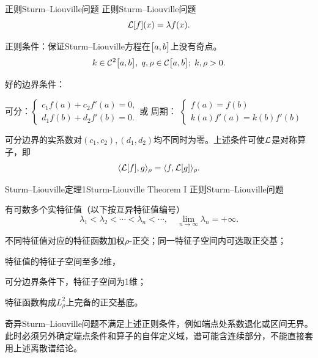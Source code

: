 \begin{definition}{正则Sturm--Liouville问题}{}
    正则Sturm--Liouville问题
    \begin{equation}
        \label{eq:mmp-sturm-liouville-eigenproblem}
        \operatorname{\mathcal L}[f](x) = \lambda f(x).
    \end{equation}
    
    正则条件：保证Sturm--Liouville方程在$\bigl[a,b\bigr]$上没有奇点。
    \begin{equation}
        \label{eq:mmp-regular-sturm-liouville-coefficients}
        k \in \mathcal{C}^2\bigl[a,b\bigr],\;q,\rho \in \mathcal{C}\bigl[a,b\bigr];\;k,\rho > 0.
    \end{equation}
    
    
    好的边界条件：
    \begin{center}
    	可分：$\begin{cases}
                c_1f(a) + c_2f'(a) = 0, \\
                d_1f(b) + d_2f'(b) = 0.
    		\end{cases}$\quad 或 \quad 周期：
    	$\begin{cases}
                f(a) = f(b) \\
			k(a)f'(a) = k(b)f'(b)
    		\end{cases}$
    \end{center}
    可分边界的实系数对$(c_1,c_2),(d_1,d_2)$均不同时为零。上述条件可使$\operatorname{\mathcal L}$是对称算子，即
    \begin{equation}
        \label{eq:mmp-symmetric-sturm-liouville}
        \langle\operatorname{\mathcal L}[f],g\rangle_\rho = \langle f,\operatorname{\mathcal L}[g]\rangle_\rho.
    \end{equation}
\end{definition}
\begin{theorem}{Sturm--Liouville定理1}{Sturm-Liouville Theorem I}
	正则Sturm--Liouville问题
	\begin{compactenum}
		\item 有可数多个实特征值（以下按互异特征值编号）
		      \begin{equation}
                \label{eq:mmp-sturm-liouville-spectrum}
				\lambda_1 < \lambda_2 < \cdots < \lambda_n < \cdots,\quad\lim_{n\to\infty}\lambda_n = +\infty.
			  \end{equation}
		\item 不同特征值对应的特征函数加权$\rho$\;-\;正交；同一特征子空间内可选取正交基；
		\item 特征值的特征子空间至多2维，

		      可分边界条件下，特征子空间为1维；
		\item 特征函数构成$L^2_\rho$上完备的正交基底。
	\end{compactenum}
    \tcblower
    奇异Sturm--Liouville问题不满足上述正则条件，例如端点处系数退化或区间无界。此时必须另外确定端点条件和算子的自伴定义域，谱可能含连续部分，不能直接套用上述离散谱结论。
\end{theorem}
